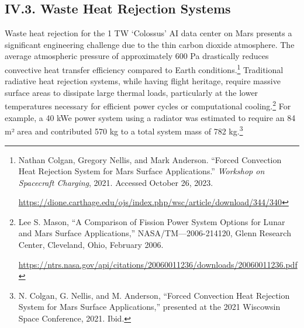 \documentclass[fontsize=10pt, oneside, DIV=calc]{scrartcl}
\begin{document}
\subsection*{IV.3. Waste Heat Rejection Systems}



\medskip

\noindent
Waste heat rejection for the 1 TW `Colossus' AI data center on Mars presents a significant engineering challenge due to the thin carbon dioxide atmosphere. The average atmospheric pressure of approximately 600 Pa drastically reduces convective heat transfer efficiency compared to Earth conditions.\footnote{Nathan Colgan, Gregory Nellis, and Mark Anderson. ``Forced Convection Heat Rejection System for Mars Surface Applications.'' \textit{Workshop on Spacecraft Charging}, 2021. Accessed October 26, 2023. 







\href{https://dione.carthage.edu/ojs/index.php/wsc/article/download/344/340}\url{https://dione.carthage.edu/ojs/index.php/wsc/article/download/344/340}} Traditional radiative heat rejection systems, while having flight heritage, require massive surface areas to dissipate large thermal loads, particularly at the lower temperatures necessary for efficient power cycles or computational cooling.\footnote{Lee S. Mason, ``A Comparison of Fission Power System Options for Lunar and Mars Surface Applications,'' NASA/TM—2006-214120, Glenn Research Center, Cleveland, Ohio, February 2006. 







\href{https://ntrs.nasa.gov/api/citations/20060011236/downloads/20060011236.pdf}\url{https://ntrs.nasa.gov/api/citations/20060011236/downloads/20060011236.pdf}} For example, a 40 kWe power system using a radiator was estimated to require an 84 m² area and contributed 570 kg to a total system mass of 782 kg.\footnote{N. Colgan, G. Nellis, and M. Anderson, ``Forced Convection Heat Rejection System for Mars Surface Applications,'' presented at the 2021 Wiscowsin Space Conference, 2021. Ibid.}

\medskip
\end{document}
